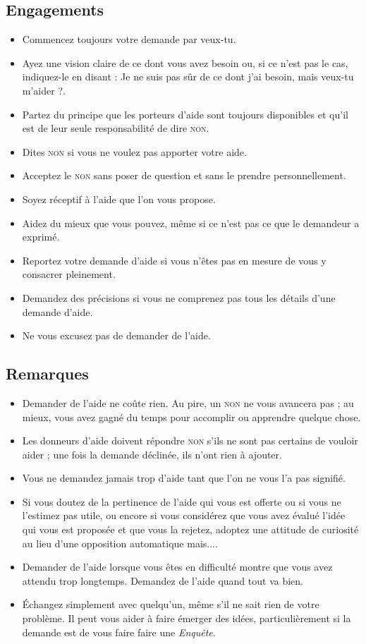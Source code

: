 \documentclass[paper=6in:9in,pagesize=pdftex,headinclude=on,footinclude=on,12pt]{scrbook}
\begin{document}
\subsection{Engagements}
\begin{itemize}
	\item Commencez toujours votre demande par \og{}veux-tu\fg{}.
	\item Ayez une vision claire de ce dont vous avez besoin ou, si ce n'est pas le cas, indiquez-le en disant : \og{}Je ne suis pas sûr
	      de ce dont j'ai besoin, mais veux-tu m'aider ?\fg{}.
    \item Partez du principe que les porteurs d'aide sont toujours disponibles et qu'il est de leur seule responsabilité de dire \textsc{non}.
    \item Dites \textsc{non} si vous ne voulez pas apporter votre aide.
    \item Acceptez le \textsc{non} sans poser de question et sans le prendre personnellement.
    \item Soyez réceptif à l'aide que l'on vous propose.
    \item Aidez du mieux que vous pouvez, même si ce n'est pas ce que le demandeur a exprimé.
    \item Reportez votre demande d'aide si vous n'êtes pas en mesure de vous y consacrer pleinement.
    \item Demandez des précisions si vous ne comprenez pas tous les détails d'une demande d'aide.
    \item Ne vous excusez pas de demander de l'aide.
\end{itemize}

\subsection{Remarques}
\begin{itemize}
	\item Demander de l'aide ne coûte rien. Au pire, un \textsc{non} ne vous avancera pas ; au mieux, vous avez gagné du temps pour
	      accomplir ou apprendre quelque chose.
	\item Les donneurs d'aide doivent répondre \textsc{non} s'ils ne sont pas certains de vouloir aider ; une fois la demande déclinée,
	      ils n'ont rien à ajouter.
	\item Vous ne demandez jamais \og{}trop\fg{} d'aide tant que l'on ne vous l'a pas signifié.
	\item Si vous doutez de la pertinence de l'aide qui vous est offerte ou si vous ne l'estimez pas utile, ou encore si vous considérez
	      que vous avez évalué l'idée qui vous est proposée et que vous la rejetez, adoptez une attitude de curiosité au lieu d'une opposition
				automatique \og{}mais...\fg{}.
	\item Demander de l'aide lorsque vous êtes en difficulté mon\-tre que vous avez attendu trop longtemps. Demandez de l'aide quand tout va bien.
	\item Échangez simplement avec quelqu'un, même s'il ne sait rien de votre problème. Il peut vous aider à faire émerger des idées,
	      particulièrement si la demande est de vous faire faire une \emph{Enquête}.
\end{itemize}
\end{document}
